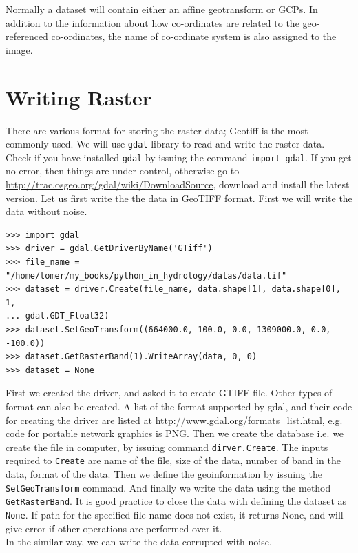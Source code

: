 \documentclass[10pt]{book}
\begin{document}
{Normally a dataset will contain either an affine geotransform or GCPs. In addition to the information about how co-ordinates are related to the geo-referenced co-ordinates, the name of co-ordinate system is also assigned to the image. 

\section{Writing Raster}
There are various format for storing the raster data; Geotiff is the most commonly used. We will use \verb"gdal" library to read and write the raster data. Check if you have installed \verb"gdal" by issuing the command \verb"import gdal". If you get no error, then things are under control, otherwise go to \url{http://trac.osgeo.org/gdal/wiki/DownloadSource}, download and install the latest version. Let us first write the the data in GeoTIFF format. First we will write the data without noise.
\beforeverb \begin{verbatim}
>>> import gdal
>>> driver = gdal.GetDriverByName('GTiff')
>>> file_name = "/home/tomer/my_books/python_in_hydrology/datas/data.tif"
>>> dataset = driver.Create(file_name, data.shape[1], data.shape[0], 1, 
... gdal.GDT_Float32)
>>> dataset.SetGeoTransform((664000.0, 100.0, 0.0, 1309000.0, 0.0, -100.0))
>>> dataset.GetRasterBand(1).WriteArray(data, 0, 0)
>>> dataset = None
\end{verbatim} \afterverb

First we created the driver, and asked it to create GTIFF file. Other types of format can also be created. A list of the format supported by gdal, and their code for creating the driver are listed at \url{http://www.gdal.org/formats_list.html}, e.g. code for portable network graphics is PNG. Then we create the database i.e. we create the file in computer, by issuing command \verb"dirver.Create". The inputs required to \verb"Create" are name of the file, size of the data, number of band in the data, format of the data. Then we define the geoinformation by issuing the \verb"SetGeoTransform" command. And finally we write the data using the method \verb"GetRasterBand". It is good practice to close the data with defining the dataset as \verb"None". If path for the specified file name does not exist, it returns None, and will give error if other operations are performed over it. \\

In the similar way, we can write the data corrupted with noise. 

}
\end{document}
